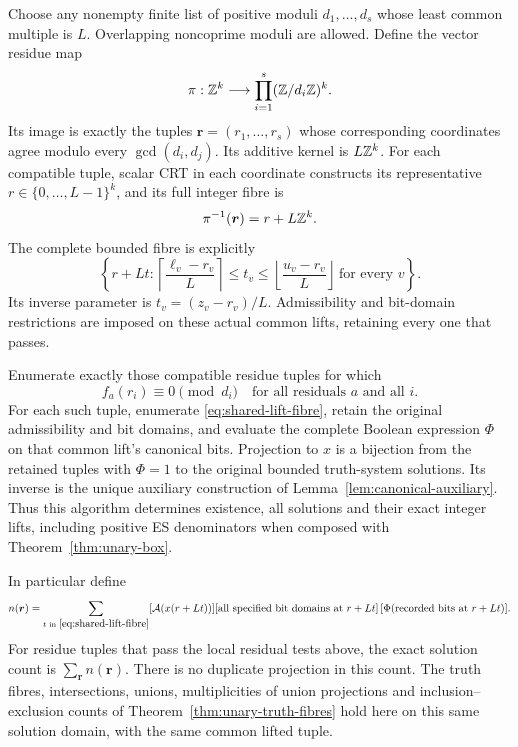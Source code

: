 \begin{theorem}
\label{thm:shared-variable-crt}
Choose any nonempty finite list of positive moduli
\(d_1,\ldots,d_s\) whose least common multiple is \(L\).
Overlapping noncoprime moduli are allowed.
Define the vector residue map
\[
 \pi:\mathbb Z^k\longrightarrow\prod_{i=1}^s(\mathbb Z/d_i\mathbb Z)^k.
\]
Its image is exactly the tuples
\(\boldsymbol r=(r_1,\ldots,r_s)\) whose corresponding
coordinates agree modulo every \(\gcd(d_i,d_j)\).
Its additive kernel is \(L\mathbb Z^k\).
For each compatible tuple, scalar CRT in each coordinate
constructs its representative
\(r\in\{0,\ldots,L-1\}^k\), and its full integer fibre is
\[
 \pi^{-1}(\boldsymbol r)=r+L\mathbb Z^k.
\]
The complete bounded fibre is explicitly
\begin{equation}\label{eq:shared-lift-fibre}
 \left\{r+Lt:
 \left\lceil\frac{\ell_v-r_v}{L}\right\rceil
 \le t_v\le
 \left\lfloor\frac{u_v-r_v}{L}\right\rfloor
 \ \text{for every }v\right\}.
\end{equation}
Its inverse parameter is \(t_v=(z_v-r_v)/L\).
Admissibility and bit-domain restrictions are imposed
on these actual common lifts, retaining every one that passes.

Enumerate exactly those compatible residue tuples for which
\[
 f_a(r_i)\equiv0\pmod{d_i}
       \quad\text{for all residuals }a\text{ and all }i.
\]
For each such tuple, enumerate
\eqref{eq:shared-lift-fibre}, retain the original admissibility
and bit domains, and evaluate the complete Boolean expression
\(\Phi\) on that common lift's canonical bits.
Projection to \(x\) is a bijection from the retained tuples
with \(\Phi=1\) to the original bounded truth-system
solutions.  Its inverse is the unique auxiliary construction
of Lemma~\ref{lem:canonical-auxiliary}.
Thus this algorithm determines existence, all solutions and
their exact integer lifts, including positive ES denominators
when composed with Theorem~\ref{thm:unary-box}.

In particular define
\[
 n(\boldsymbol r)=
 \sum_{\substack{t\text{ in }\eqref{eq:shared-lift-fibre}}}
 [\mathcal A(x(r+Lt))]
 [\text{all specified bit domains at }r+Lt]\,
 [\Phi(\text{recorded bits at }r+Lt)].
\]
For residue tuples that pass the local residual tests above,
the exact solution count is \(\sum_{\boldsymbol r}n(\boldsymbol r)\).
There is no duplicate projection in this count.
The truth fibres, intersections, unions, multiplicities of union
projections and inclusion--exclusion counts of
Theorem~\ref{thm:unary-truth-fibres} hold here on this same
solution domain, with the same common lifted tuple.
\end{theorem}

